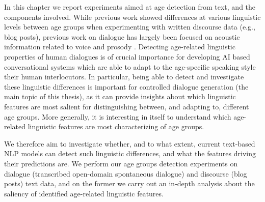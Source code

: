
In this chapter we report experiments aimed at age detection from text, and the components involved. 
While previous work showed differences at various linguistic levels between age groups when experimenting with written discourse data (e.g., blog posts), previous work on dialogue has largely been focused on acoustic information related to voice and prosody \citep{wolters2009age, li2013automatic}.
Detecting age-related linguistic properties of human dialogues is of crucial importance for developing AI based conversational systems which are able to adapt to the age-specific speaking style their human interlocutors. In particular, being able to detect and investigate these linguistic differences is important for controlled dialogue generation (the main topic of this thesis), as it can provide insights about which linguistic features are most salient for distinguishing between, and adapting to, different age groups. More generally, it is interesting in itself to understand which age-related linguistic features are most characterizing of age groups. 

We therefore aim to investigate whether, and to what extent, current text-based NLP models can detect such linguistic differences, and what the features driving their predictions are. We perform our age groups detection experiments on dialogue (transcribed open-domain spontaneous dialogue) and discourse (blog posts) text data, and on the former we carry out an in-depth analysis about the saliency of identified age-related linguistic features.


